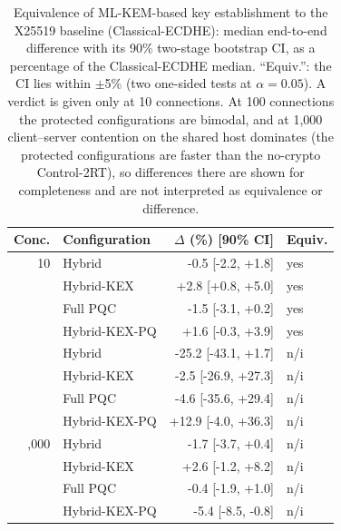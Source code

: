 \begin{table}[t]
\centering
\caption{Equivalence of ML-KEM-based key establishment to the X25519 baseline (Classical-ECDHE): median end-to-end difference with its 90\% two-stage bootstrap CI, as a percentage of the Classical-ECDHE median. ``Equiv.'': the CI lies within $\pm$5\% (two one-sided tests at $\alpha=0.05$). A verdict is given only at 10 connections. At 100 connections the protected configurations are bimodal, and at 1,000 client--server contention on the shared host dominates (the protected configurations are faster than the no-crypto Control-2RT), so differences there are shown for completeness and are not interpreted as equivalence or difference.}
\label{tab:equivalence}
\setlength{\tabcolsep}{3pt}
\footnotesize
\begin{tabular}{@{}rlrl@{}}
\toprule
Conc. & Configuration & $\Delta$ (\%) [90\% CI] & Equiv. \\
\midrule
10 & Hybrid & -0.5 [-2.2, +1.8] & yes \\
 & Hybrid-KEX & +2.8 [+0.8, +5.0] & yes \\
 & Full PQC & -1.5 [-3.1, +0.2] & yes \\
 & Hybrid-KEX-PQ & +1.6 [-0.3, +3.9] & yes \\
\addlinespace
100 & Hybrid & -25.2 [-43.1, +1.7] & n/i \\
 & Hybrid-KEX & -2.5 [-26.9, +27.3] & n/i \\
 & Full PQC & -4.6 [-35.6, +29.4] & n/i \\
 & Hybrid-KEX-PQ & +12.9 [-4.0, +36.3] & n/i \\
\addlinespace
1,000 & Hybrid & -1.7 [-3.7, +0.4] & n/i \\
 & Hybrid-KEX & +2.6 [-1.2, +8.2] & n/i \\
 & Full PQC & -0.4 [-1.9, +1.0] & n/i \\
 & Hybrid-KEX-PQ & -5.4 [-8.5, -0.8] & n/i \\
\bottomrule
\end{tabular}
\end{table}
